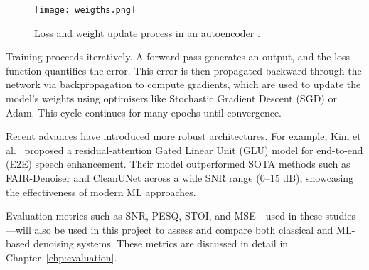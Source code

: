 \begin{figure}[h]
    \centering
    \texttt{[image: weigths.png]}
    \caption{\label{fig:weigths} Loss and weight update process in an autoencoder \cite{epoch2021}.}
\end{figure}

Training proceeds iteratively. A forward pass generates an output, and the loss function quantifies the error. This error is then propagated backward through the network via backpropagation to compute gradients, which are used to update the model’s weights using optimisers like Stochastic Gradient Descent (SGD) or Adam. This cycle continues for many epochs until convergence.

Recent advances have introduced more robust architectures. For example, Kim et al.~\cite{kim2024residual} proposed a residual-attention Gated Linear Unit (GLU) model for end-to-end (E2E) speech enhancement. Their model outperformed SOTA methods such as FAIR-Denoiser and CleanUNet across a wide SNR range (0–15 dB), showcasing the effectiveness of modern ML approaches.

Evaluation metrics such as SNR, PESQ, STOI, and MSE—used in these studies—will also be used in this project to assess and compare both classical and ML-based denoising systems. These metrics are discussed in detail in Chapter~\ref{chp:evaluation}.
